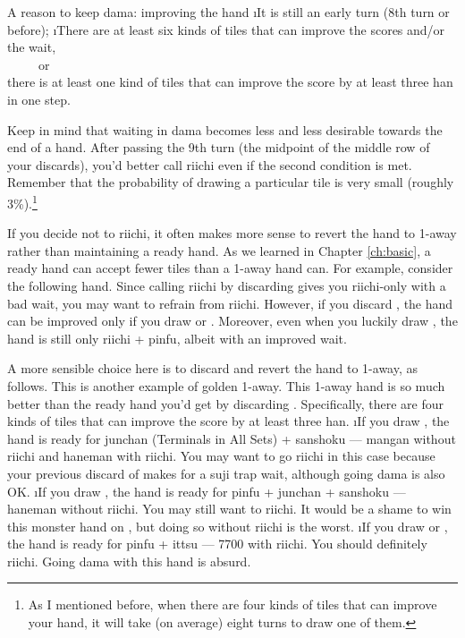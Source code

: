 \bigskip
\begin{itembox}[c]{A reason to keep {\jap dama}: improving the hand}
\bi
\i It is still an early turn (8th turn or before);
\i There are at least six kinds of tiles that can improve the scores and/or the wait, \\~~~~~or\\
there is at least one kind of tiles that can improve the score by at least three {\jap han} in one step.
\ei
\end{itembox}

\bigskip
Keep in mind that waiting in {\jap dama} becomes less and less desirable towards the end of a hand. After passing the 9th turn (the midpoint of the middle row of your discards), you'd better call riichi even if the second condition is met. Remember that the probability of drawing a particular tile is very small (roughly 3\%).\footnote{As I mentioned before, when there are four kinds of tiles that can improve your hand, it will take (on average) eight turns to draw one of them.}

\bigskip
If you decide not to riichi, it often makes more sense to revert the hand to 1-away rather than maintaining a ready hand. As we learned in Chapter \ref{ch:basic}, a ready hand can accept fewer tiles than a 1-away hand can. For example, consider the following hand.
\bp
{}%
\ep
Since calling riichi by discarding {\LARGE {}} gives you riichi-only with a bad wait, you may want to refrain from riichi. However, if you discard {\LARGE {}}, the hand can be improved only if you draw {\LARGE {}} or {\LARGE {}}. Moreover, even when you luckily draw {\LARGE {}}, the hand is still only riichi + {\jap pinfu}, albeit with an improved wait. 

\bigskip
A more sensible choice here is to discard {\LARGE {}} and revert the hand to 1-away, as follows. 
\bp
{}%
\ep
This is another example of golden 1-away. 
This 1-away hand is so much better than the ready hand you'd get by discarding {\LARGE {}}. Specifically, there are four kinds of tiles that can improve the score by at least three {\jap han}. 
\bi {}
\i If you draw {\LARGE{}}, the hand is ready for {\jap junchan} (Terminals in All Sets) + {\jap sanshoku} --- {\jap mangan} without riichi and {\jap haneman} with riichi. You may want to go riichi in this case because your previous discard of {\LARGE {}} makes for a {\jap suji} trap wait, although going {\jap dama} is also OK. 
\i If you draw {\LARGE{}}, the hand is ready for {\jap pinfu + junchan + sanshoku} --- {\jap haneman} without riichi. You may still want to riichi. It would be a shame to win this monster hand on {\LARGE{}}, but doing so without riichi is the worst. 
\i If you draw {\LARGE{}} or {\LARGE{}}, the hand is ready for {\jap pinfu + ittsu} --- 7700 with riichi. You should definitely riichi. Going {\jap dama} with this hand is absurd.
\ei

